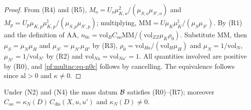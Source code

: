 \begin{proof}
From (R4) and (R5), $M_o=U_o\mu_{K,o}^2/(\mu_{S,o}\mu_{S',o})$ and $M_p=U_p\mu_{K,p}\mu^\natural_{K,p}/(\mu_{S,p}\mu_{S',p})$;
multiplying, $\mathrm{MM}=U\mu_K\mu_K^\natural/(\mu_S\mu_{S'})$. By (R1) and the definition of $\mathrm{AA}$,
$n_{0c}=\mathrm{vol}_BC_{oo}\mathrm{MM}/(\mathrm{vol}_{ZZ}\mu_K\rho_0)$. Substitute $\mathrm{MM}$, then $\mu_S=\mu_N\mu_H$ and
$\mu_{S'}=\mu_{N'}\mu_{H'}$ by (R3), $\rho_0=\mathrm{vol}_{Ha}/(\mathrm{vol}_H\mu_H)$ and $\mu_N=1/\mathrm{vol}_N$,
$\mu_{N'}=1/\mathrm{vol}_{N'}$ by (R2) and $\mathrm{vol}_{Na}=\mathrm{vol}_{Na'}=1$. All quantities involved are positive by
(R0), and \eqref{pf:multnc:eq-n0c} follows by cancelling. The equivalence follows since $\mathrm{al}>0$ and $\kappa\ne0$.
\end{proof}

\begin{lemma}\label{pf:multnc:record}
Under (N2) and (N4) the mass datum $\mathcal{B}$ satisfies (R0)--(R7); moreover $C_{oo}=\kappa_N(D)\,C_{\mathrm{dis}}(X,u,u')$
and $\kappa_N(D)\ne0$.
\end{lemma}


